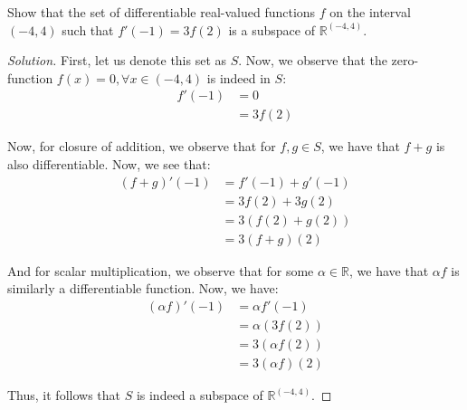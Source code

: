 \documentclass[openany]{book}
\newenvironment{solution}{\begin{proof}[Solution]}{\end{proof}}
\newcommand{\RR}{\mathbb{R}}
\begin{document}
	\begin{hw}
		Show that the set of differentiable real-valued functions $f$ on the interval $(-4, 4)$ such that $f'(-1) = 3f(2)$ is a subspace of $\RR^{(-4,4)}$.
	\end{hw}
	\begin{solution}
		First, let us denote this set as $S$. Now, we observe that the zero-function $f(x) = 0, \forall x \in (-4,4)$ is indeed in $S$:
		\begin{align*}
			f'(-1) &= 0 \\
			&= 3f(2)
		\end{align*}
	
		Now, for closure of addition, we observe that for $f,g \in S$, we have that $f+g$ is also differentiable. Now, we see that:
		\begin{align*}
			(f+g)'(-1) &= f'(-1) + g'(-1) \\
			&= 3f(2) + 3g(2) \\
			&= 3(f(2) +g(2)) \\
			&= 3 (f+g)(2)
		\end{align*}
	
		And for scalar multiplication, we observe that for some $\alpha \in \RR$, we have that $\alpha f$ is similarly a differentiable function. Now, we have:
		\begin{align*}
			(\alpha f)'(-1) &= \alpha f'(-1) \\
			&= \alpha (3f(2)) \\
			&= 3(\alpha f(2)) \\
			&= 3 (\alpha f)(2)
		\end{align*}
	
		Thus, it follows that $S$ is indeed a subspace of $\RR^{(-4,4)}$.
	\end{solution}
\end{document}
